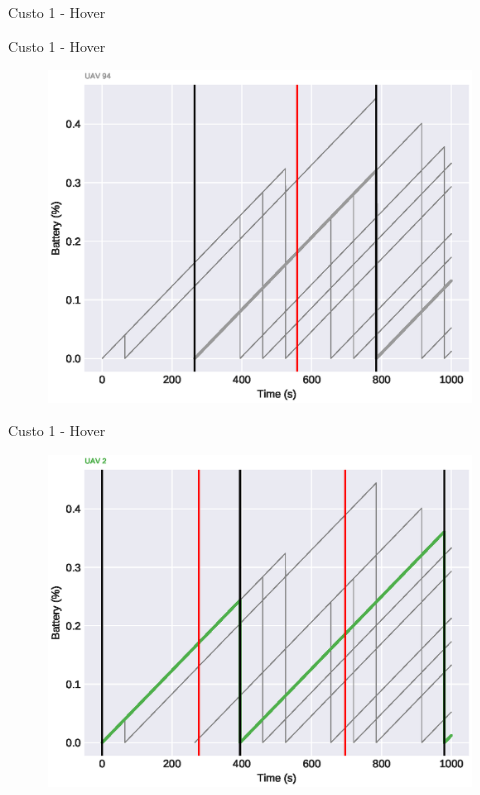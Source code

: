 \begin{frame}{Custo 1 - Hover}
            \end{frame}\begin{frame}{Custo 1 - Hover}
                \begin{figure}[!htb]
                     \includegraphics[width=\textwidth]{custo_1/uav_hover_acum_uav_8.eps}
                 \end{figure}
            \end{frame}\begin{frame}{Custo 1 - Hover}
                \begin{figure}[!htb]
                     \includegraphics[width=\textwidth]{custo_1/uav_hover_acum_uav_2.eps}

\end{figure}
\end{frame}
